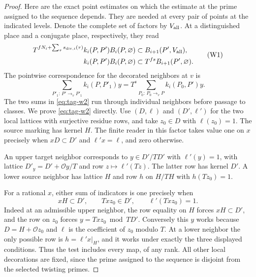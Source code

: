\begin{proof}
Here are the exact point estimates on which the estimate at the prime assigned to the sequence
depends. They are needed at every pair of points at the indicated
levels. Denote the complete set of factors by \(V_{\rm all}\).
At a distinguished place and a conjugate place, respectively, they read
\[
\begin{split}
 T^{fN_i+\sum_\tau s_{{\rm div},i}(\tau)}
    k_i(P,P')B_i(P,\varnothing)
       &\subset B_{i+1}(P',V_{\rm all}),\\
    k_i(P,P')B_i(P,\varnothing)
       &\subset T^{fs} B_{i+1}(P',\varnothing).
\end{split}                                                       \tag{W1}\label{eq:tag-w1}
\]
The pointwise correspondence for the decorated neighbors at \(v\) is
\[
  \sum_{P'_1:\,P'\to_v P'_1}k_i(P,P'_1)y
       =T^s\sum_{P_0:\,P_0\to_v P}k_i(P_0,P')y .               \tag{W2}\label{eq:tag-w2}
\]
The two sums in \eqref{eq:tag-w2} run through individual neighbors before passage
to classes. We prove \eqref{eq:tag-w2} directly. Use \((D,\ell)\) and
\((D',\ell')\) for the two local lattices with surjective residue
rows, and take \(z_0\in D\) with \(\ell(z_0)=1\). The source
marking has kernel \(H\). The finite reader in this factor takes
value one on \(x\) precisely when \(xD\subset D'\) and
\(\ell'x=\ell\), and zero otherwise.

An upper target neighbor corresponds to \(y\in D'/TD'\) with
\(\ell'(y)=1\), with lattice \(D'_y=D'+\mathcal O y/T\) and
row \(z\mapsto\ell'(Tz)\). The latter row has kernel \(D'\).
A lower source neighbor has lattice \(H\) and row \(h\) on
\(H/TH\) with \(h(Tz_0)=1\).

For a rational \(x\), either
sum of indicators is one precisely when
\[
                xH\subset D',\qquad Txz_0\in D',
                  \qquad \ell'(Txz_0)=1.
\]
Indeed at an admissible upper neighbor, the row equality on
\(H\) forces \(xH\subset D'\), and the row on \(z_0\) forces
\(y=Txz_0\bmod TD'\). Conversely this \(y\) works because
\(D=H+\mathcal O z_0\) and \(\ell\) is the coefficient of
\(z_0\) modulo \(T\). At a lower neighbor the only possible
row is \(h=\ell'x|_H\), and it works under exactly the three
displayed conditions. Thus the test includes every map, of
any rank. All other local decorations are fixed, since the
prime assigned to the sequence is disjoint from the selected twisting primes.


\end{proof}
